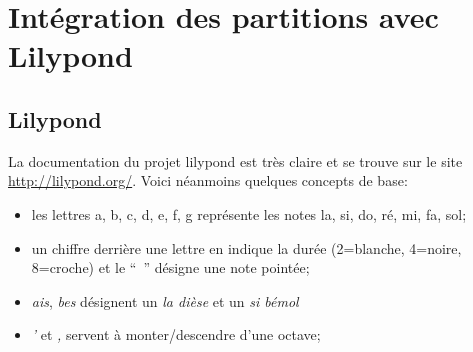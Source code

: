 \documentclass[a4paper,twoside]{article}
\begin{document}
%
%
%
%
%


\section{Intégration des partitions avec Lilypond}

\subsection{Lilypond}

La documentation du projet lilypond est très
claire et se trouve sur le site \url{http://lilypond.org/}.
Voici néanmoins quelques concepts de base:

\begin{itemize}
\item les lettres a, b, c, d, e, f, g représente les notes la, si, do,
  ré, mi, fa, sol;
\item un chiffre derrière une lettre en indique la durée (2=blanche, 4=noire,
  8=croche) et le ``~'' désigne une note pointée;
\item \emph{ais}, \emph{bes} désignent un \emph{la dièse} et un \emph{si bémol}
\item \emph{'} et \emph{,} servent à monter/descendre d'une octave;
\end{itemize}
\end{document}
